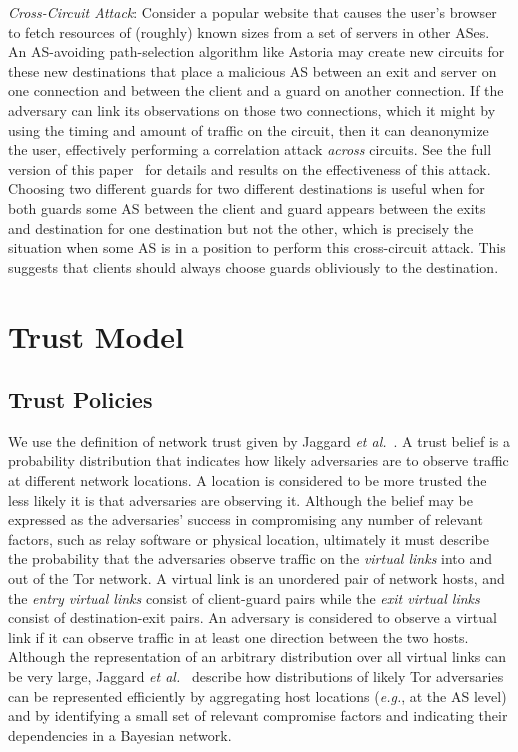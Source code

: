 \documentclass[conference]{styles/IEEEtran}
\newcommand{\etal}{\emph{et al.}}
\newcommand{\eg}{\emph{e.g.}}
\begin{document}
\textit{Cross-Circuit Attack}: Consider a popular website that causes the user's browser to fetch
resources of (roughly) known sizes from a set of servers in other ASes. An AS-avoiding
path-selection algorithm like Astoria may create new circuits for these new destinations that place
a malicious AS between an exit and server on one connection and between the client and
a guard on another connection. If the adversary can link its
observations on those two connections, which it might by using the timing and amount of traffic on
the circuit, then it can deanonymize the user, effectively performing a correlation attack
\emph{across} circuits. See the full version of this paper~\cite{taps-arxiv} for details and results
on the effectiveness of this attack. Choosing two different guards for two different destinations is
useful when for both guards some AS between the client and guard appears between the exits and
destination for one destination but not the other, which is precisely the situation when some AS is
in a position to perform this cross-circuit attack. This suggests that clients should always choose
guards obliviously to the destination.

\fi 

\section{Trust Model}\label{sec:model}
\subsection{Trust Policies}
We use the definition of network trust given by Jaggard \etal~\cite{trustrep-popets14}.
A trust belief is a probability distribution that indicates how likely adversaries are
to observe traffic at different network locations. A location is considered to be more trusted the
less likely it is that adversaries are observing it. Although the belief may be
expressed as the adversaries' success in compromising any number of relevant factors, such as relay 
software or physical location, ultimately
it must describe the probability that the adversaries observe traffic on the \emph{virtual links}
into and out of the Tor network. A virtual link is an unordered pair of network hosts, and the
\emph{entry virtual links} consist of client-guard pairs while the \emph{exit virtual links}
consist of destination-exit
pairs. An adversary is considered to observe a virtual link if it can observe traffic in
at least one direction between the two hosts. Although the representation of an arbitrary
distribution over all virtual links can be very large, Jaggard \etal~\cite{trustrep-popets14}
describe how distributions of likely Tor adversaries can be represented efficiently by aggregating
host locations (\eg{}, at the AS level) and by identifying a small set of relevant compromise
factors and indicating their dependencies in a Bayesian network.
\end{document}
